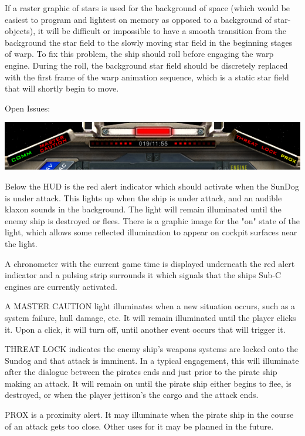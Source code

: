 If a raster graphic of stars is used for the background of space (which would be easiest to program and lightest on memory as opposed to a background of star-objects), it will be difficult or impossible to have a smooth transition from the background the star field to the slowly moving star field in the beginning stages of warp. To fix this problem, the ship should roll before engaging the warp engine. During the roll, the background star field should be discretely replaced with the first frame of the warp animation sequence, which is a static star field that will shortly begin to move. 

Open Issues:
\begin{itemize}

\includegraphics[scale=0.7]{images/lower-hud.png}

Below the HUD is the red alert indicator which should activate when the
SunDog is under attack.  This lights up when the ship is under attack, and an audible klaxon sounds in the background. The light will remain illuminated until the enemy ship is destroyed or flees. There is a graphic image for the "on" state of the light, which allows some reflected illumination to appear on cockpit surfaces near the light. 


A chronometer with the current game time is displayed underneath the red
alert indicator and a pulsing strip surrounds it which signals that the ships
Sub-C engines are currently activated.

A MASTER CAUTION light illuminates when a new situation occurs, such as a system failure, hull damage, etc. It will remain illuminated until the player clicks it. Upon a click, it will turn off, until another event occurs that will trigger it. 

THREAT LOCK indicates the enemy ship's weapons systems are locked onto the Sundog and that attack is imminent. In a typical engagement, this will illuminate after the dialogue between the pirates ends and just prior to the pirate ship making an attack. It will remain on until the pirate ship either begins to flee, is destroyed, or when the player jettison's the cargo and the attack ends. 

PROX is a proximity alert. It may illuminate when the pirate ship in the course of an attack gets too close. Other uses for it may be planned in the future. 


\end{itemize}
